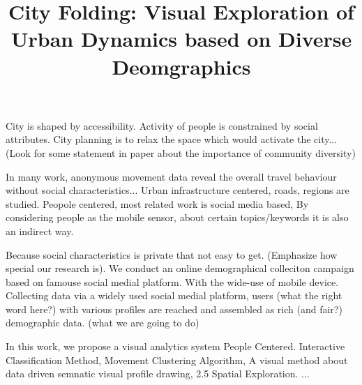 \documentclass[journal]{vgtc}                %
\title{City Folding: Visual Exploration of Urban Dynamics based on Diverse Deomgraphics}
\begin{document}


\maketitle


City is shaped by accessibility. Activity of people is constrained by social attributes. City planning is to relax the space which would activate the city... (Look for some statement in paper about the importance of community diversity)

In many work, anonymous movement data reveal the overall travel behaviour without social characteristics... Urban infrastructure centered, roads, regions are studied. Peopole centered, most related work is social media based, By considering people as the mobile sensor, about certain topics/keywords it is also an indirect way. 

Because social characteristics is private that not easy to get. (Emphasize how special our research is). We conduct an online demographical colleciton campaign based on famouse social medial platform. With the wide-use of mobile device. Collecting data via a widely used social medial platform, users (what the right word here?) with various profiles are reached and assembled as rich (and fair?) demographic data. (what we are going to do)

In this work, we propose a visual analytics system People Centered. Interactive Classification Method, Movement Clustering Algorithm, A visual method about data driven semnatic visual profile drawing, 2.5 Spatial Exploration. ...








% 
\end{document}
